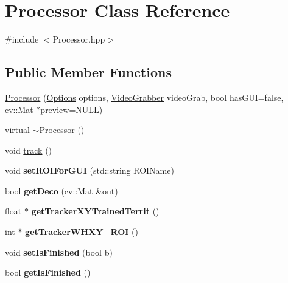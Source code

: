 \hypertarget{classProcessor}{\section{Processor Class Reference}
\label{classProcessor}
}


{\ttfamily \#include $<$Processor.\-hpp$>$}

\subsection*{Public Member Functions}
\begin{DoxyCompactItemize}
\item 
\hyperlink{classProcessor_acaeabaa5d52c03c6a112118c49196dbf}{Processor} (\hyperlink{structOptions}{Options} options, \hyperlink{classVideoGrabber}{Video\-Grabber} video\-Grab, bool has\-G\-U\-I=false, cv\-::\-Mat $\ast$preview=N\-U\-L\-L)
\item 
virtual \hyperlink{classProcessor_acf37952c5b420d4e903a512571678692}{$\sim$\-Processor} ()
\item 
void \hyperlink{classProcessor_a68a22b324edc0ef64f9b3cd513b1e778}{track} ()
\item 
\hypertarget{classProcessor_a094fa536ef16ea3662c3377928115275}{void {\bfseries set\-R\-O\-I\-For\-G\-U\-I} (std\-::string R\-O\-I\-Name)}\label{classProcessor_a094fa536ef16ea3662c3377928115275}

\item 
\hypertarget{classProcessor_a387474f67ba72edc1ed8aaed34f1d112}{bool {\bfseries get\-Deco} (cv\-::\-Mat \&out)}\label{classProcessor_a387474f67ba72edc1ed8aaed34f1d112}

\item 
\hypertarget{classProcessor_afeff66ffd64ccf90acf26a39650a1c72}{float $\ast$ {\bfseries get\-Tracker\-X\-Y\-Trained\-Territ} ()}\label{classProcessor_afeff66ffd64ccf90acf26a39650a1c72}

\item 
\hypertarget{classProcessor_af36c27815deeae7607e37e14fe5e2a02}{int $\ast$ {\bfseries get\-Tracker\-W\-H\-X\-Y\-\_\-\-R\-O\-I} ()}\label{classProcessor_af36c27815deeae7607e37e14fe5e2a02}

\item 
\hypertarget{classProcessor_af2dc8564c9f51b94c354ca27ef4ef0f6}{void {\bfseries set\-Is\-Finished} (bool b)}\label{classProcessor_af2dc8564c9f51b94c354ca27ef4ef0f6}

\item 
\hypertarget{classProcessor_a7e82f65e87756a77c1730aa3f0f808bb}{bool {\bfseries get\-Is\-Finished} ()}\label{classProcessor_a7e82f65e87756a77c1730aa3f0f808bb}


\end{DoxyCompactItemize}
